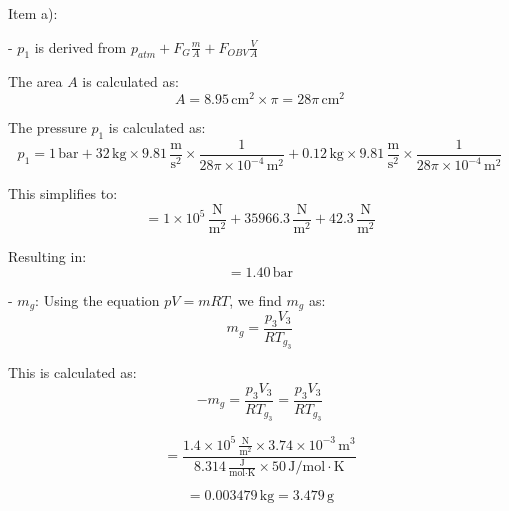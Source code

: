 Item a):

- \( p_1 \) is derived from \( p_{atm} + F_G \frac{m}{A} + F_{OBV} \frac{V}{A} \)

The area \( A \) is calculated as:
\[ A = 8.95 \, \text{cm}^2 \times \pi = 28 \pi \, \text{cm}^2 \]

The pressure \( p_1 \) is calculated as:
\[ p_1 = 1 \, \text{bar} + 32 \, \text{kg} \times 9.81 \, \frac{\text{m}}{\text{s}^2} \times \frac{1}{28 \pi \times 10^{-4} \, \text{m}^2} + 0.12 \, \text{kg} \times 9.81 \, \frac{\text{m}}{\text{s}^2} \times \frac{1}{28 \pi \times 10^{-4} \, \text{m}^2} \]

This simplifies to:
\[ = 1 \times 10^5 \, \frac{\text{N}}{\text{m}^2} + 35966.3 \, \frac{\text{N}}{\text{m}^2} + 42.3 \, \frac{\text{N}}{\text{m}^2} \]

Resulting in:
\[ = 1.40 \, \text{bar} \]

- \( m_g \): Using the equation \( pV = mRT \), we find \( m_g \) as:
\[ m_g = \frac{p_3 V_3}{R T_{g_3}} \]

This is calculated as:
\[ -m_g = \frac{p_3 V_3}{R T_{g_3}} = \frac{p_3 V_3}{R T_{g_3}} \]

\[ = \frac{1.4 \times 10^5 \, \frac{\text{N}}{\text{m}^2} \times 3.74 \times 10^{-3} \, \text{m}^3}{8.314 \, \frac{\text{J}}{\text{mol} \cdot \text{K}} \times 50 \, \text{J} / \text{mol} \cdot \text{K}} \]

\[ = 0.003479 \, \text{kg} = 3.479 \, \text{g} \]